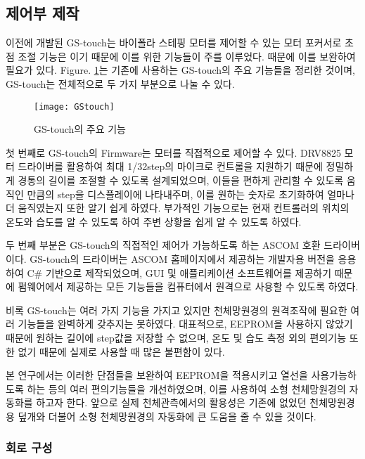 \newpage
\subsection{제어부 제작}

이전에 개발된 GS-touch는 바이폴라 스테핑 모터를 제어할 수 있는 모터 포커서로 초점 조절 기능은 이기 때문에 이를 위한 기능들이 주를 이루었다. 때문에 이를 보완하여 필요가 있다. \textrm{Figure}. \ref{GStocuh}는 기존에 사용하는 GS-touch의 주요 기능들을 정리한 것이며, GS-touch는 전체적으로 두 가지 부분으로 나눌 수 있다.

\bigskip
\begin{figure}[h]
	\begin{center}
		\texttt{[image: GStouch]}
	\end{center}
	\caption{GS-touch의 주요 기능}
	\label{GStocuh}
\end{figure}

첫 번째로 GS-touch의 Firmware는 모터를 직접적으로 제어할 수 있다. DRV8825 모터 드라이버를 활용하여 최대 1/32step의 마이크로 컨트롤을 지원하기 때문에 정밀하게 경통의 길이를 조절할 수 있도록 설계되었으며, 이들을 편하게 관리할 수 있도록 움직인 만큼의 step을 디스플레이에 나타내주며, 이를 원하는 숫자로 초기화하여 얼마나 더 움직였는지 또한 알기 쉽게 하였다. 부가적인 기능으로는 현재 컨트롤러의 위치의 온도와 습도를 알 수 있도록 하여 주변 상황을 쉽게 알 수 있도록 하였다.

두 번째 부분은 GS-touch의 직접적인 제어가 가능하도록 하는 ASCOM 호환 드라이버이다. GS-touch의 드라이버는 ASCOM 홈페이지에서 제공하는 개발자용 버전을 응용하여 C\# 기반으로 제작되었으며, GUI 및 애플리케이션 소프트웨어를 제공하기 때문에 펌웨어에서 제공하는 모든 기능들을 컴퓨터에서 원격으로 사용할 수 있도록 하였다.

비록 GS-touch는 여러 가지 기능을 가지고 있지만 천체망원경의 원격조작에 필요한 여러 기능들을 완벽하게 갖추지는 못하였다. 대표적으로, EEPROM을 사용하지 않았기 때문에 원하는 길이에 step값을 저장할 수 없으며, 온도 및 습도 측정 외의 편의기능 또한 없기 때문에 실제로 사용할 때 많은 불편함이 있다. 

본 연구에서는 이러한 단점들을 보완하여 EEPROM을 적용시키고 열선을 사용가능하도록 하는 등의 여러 편의기능들을 개선하였으며, 이를 사용하여 소형 천체망원경의 자동화를 하고자 한다. 앞으로 실제 천체관측에서의 활용성은 기존에 없었던 천체망원경용 덮개와 더불어 소형 천체망원경의 자동화에 큰 도움을 줄 수 있을 것이다.

\subsubsection{회로 구성}

